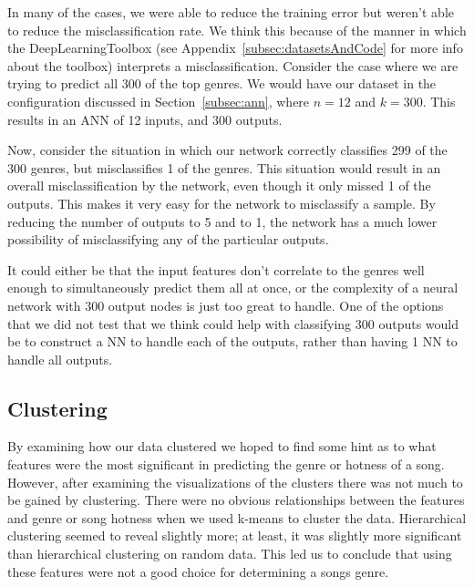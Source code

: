 \documentclass[12pt]{article}
\begin{document}
In many of the cases, we were able to reduce the training error but weren't able to reduce the misclassification rate. We think this because of the manner in which the DeepLearningToolbox (see Appendix~\ref{subsec:datasetsAndCode} for more info about the toolbox) interprets a misclassification. Consider the case where we are trying to predict all 300 of the top genres. We would have our dataset in the configuration discussed in Section~\ref{subsec:ann}, where $n = 12$ and $k = 300$. This results in an ANN of 12 inputs, and 300 outputs. 

Now, consider the situation in which our network correctly classifies 299 of the 300 genres, but misclassifies 1 of the genres. This situation would result in an overall misclassification by the network, even though it only missed 1 of the outputs. This makes it very easy for the network to misclassify a sample. By reducing the number of outputs to 5 and to 1, the network has a much lower possibility of misclassifying any of the particular outputs. 

It could either be that the input features don't correlate to the genres well enough to simultaneously predict them all at once, or the complexity of a neural network with 300 output nodes is just too great to handle. One of the options that we did not test that we think could help with classifying 300 outputs would be to construct a NN to handle each of the outputs, rather than having 1 NN to handle all outputs. 

\subsection{Clustering}
\label{subsec:clusteringDisc}
By examining how our data clustered we hoped to find some hint as to what features were the most significant in predicting the genre or hotness of a song.
However, after examining the visualizations of the clusters there was not much to be gained by clustering. There were no obvious relationships between
the features and genre or song hotness when we used k-means to cluster the data. Hierarchical clustering seemed to reveal slightly more; at least, it was slightly more significant than hierarchical clustering on random data. This led us to conclude that using these features were not a good choice for 
determining a songs genre. 
\end{document}
